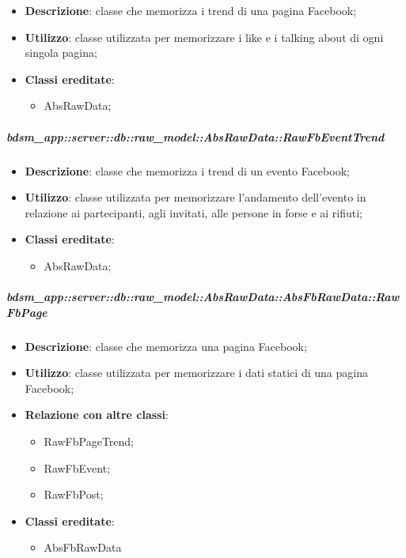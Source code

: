 			\label{subp:bdsm_app_server_raw_model_AbsRawData_RawFbPageTrend}
				\begin{itemize}
					\item \textbf{Descrizione}: classe che memorizza i trend di una pagina Facebook;
					\item \textbf{Utilizzo}: classe utilizzata per memorizzare i like e i talking about di ogni singola pagina;
					\item \textbf{Classi ereditate}:
					\begin{itemize}
						\item AbsRawData;
					\end{itemize}
				\end{itemize}
				\subparagraph{bdsm\_app::server::db::raw\_model::AbsRawData::RawFbEventTrend} %
			\label{subp:bdsm_app_server_raw_model_AbsRawData_RawFbEventTrend}
				\begin{itemize}
					\item \textbf{Descrizione}: classe che memorizza i trend di un evento Facebook;
					\item \textbf{Utilizzo}: classe utilizzata per memorizzare l'andamento dell'evento in relazione ai partecipanti, agli invitati, alle persone in forse e ai rifiuti;
					\item \textbf{Classi ereditate}:
					\begin{itemize}
						\item AbsRawData;
					\end{itemize}
				\end{itemize}
					\subparagraph{bdsm\_app::server::db::raw\_model::AbsRawData::AbsFbRawData::RawFbPage} %
			\label{subp:bdsm_app_server_raw_model_AbsRawData_AbsFbRawData_RawFbPage}
				\begin{itemize}
					\item \textbf{Descrizione}: classe che memorizza una pagina Facebook;
					\item \textbf{Utilizzo}: classe utilizzata per memorizzare i dati statici di una pagina Facebook;
					\item \textbf{Relazione con altre classi}:
					\begin{itemize}
						\item RawFbPageTrend;
						\item RawFbEvent;
						\item RawFbPost;
					\end{itemize}
					\item \textbf{Classi ereditate}:
					\begin{itemize}
						\item AbsFbRawData
					\end{itemize}
				\end{itemize}
